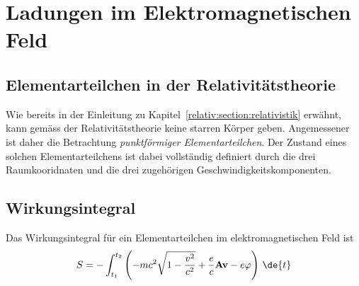
\section{Ladungen im Elektromagnetischen Feld 
\label{relativ:section:em_feld}}

\subsection{Elementarteilchen in der Relativitätstheorie 
\label{relativ:section:elementarteilchen}}

Wie bereits in der Einleitung zu Kapitel~\ref{relativ:section:relativistik} erwähnt,
kann gemäss der Relativitätstheorie keine starren Körper geben.
Angemessener ist daher die Betrachtung \emph{punktförmiger Elementarteilchen}.
Der Zustand eines solchen Elementarteilchens ist dabei vollständig definiert durch
die drei Raumkooridnaten und die drei zugehörigen Geschwindigkeitskomponenten.

\subsection{ Wirkungsintegral 
\label{relativ:section:wirkungsintegral}}

Das Wirkungsintegral für ein Elementarteilchen im elektromagnetischen Feld ist
\begin{equation}
    S = - \int_{t_1}^{t_2} \left( -mc^2 \sqrt{1-\frac{v^2}{c^2}} + \frac{e}{c} \mathbf{A} \mathbf{v} - e \varphi \right) \, \de{t}
\end{equation}
